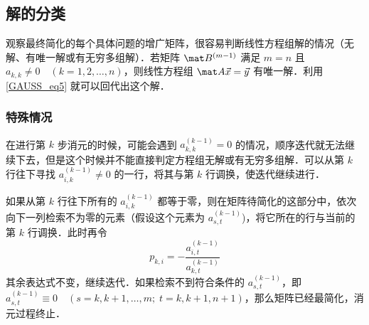 
\subsection{解的分类}

观察最终简化的每个具体问题的增广矩阵，很容易判断线性方程组解的情况（无解、有唯一解或有无穷多组解）．若矩阵 $\mat B^{(m-1)}$ 满足 $m=n$ 且 $a_{k,k}\neq 0 \quad (k=1,2,\dots,n)$，则线性方程组 $\mat A \vec x = \vec y$ 有唯一解．利用\autoref{GAUSS_eq5} 就可以回代出这个解．

\subsubsection{特殊情况}
在进行第 $k$ 步消元的时候，可能会遇到 $a_{k,k}^{(k-1)}=0$ 的情况，顺序迭代就无法继续下去，但是这个时候并不能直接判定方程组无解或有无穷多组解．可以从第 $k$ 行往下寻找 $a_{i,k}^{(k-1)} \neq 0$ 的一行，将其与第 $k$ 行调换，使迭代继续进行．

如果从第 $k$ 行往下所有的 $a_{i,k}^{(k-1)}$ 都等于零，则在矩阵待简化的这部分中，依次向下一列检索不为零的元素（假设这个元素为 $a_{s,t}^{(k-1)}$)，将它所在的行与当前的第 $k$ 行调换．此时再令
\begin{equation}
p_{k,i} = - \frac{a_{i,t}^{(k-1)}}{a_{k,t}^{(k-1)}}
\end{equation}
其余表达式不变，继续迭代．如果检索不到符合条件的 $a_{s,t}^{(k-1)}$，即 $a_{s,t}^{(k-1)} \equiv 0 \quad(s=k,k+1,\dots,m;\;t=k,k+1,n+1)$，那么矩阵已经最简化，消元过程终止．

